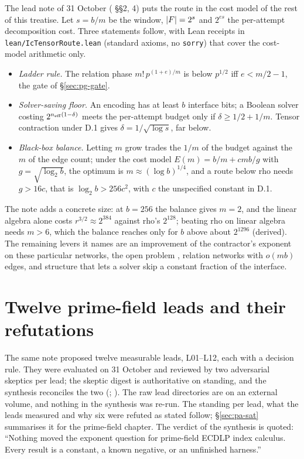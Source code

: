 The lead note of 31 October
( \S\S2, 4) puts the
route in the cost model of the rest of this treatise. Let $s=b/m$ be the
window, $\lvert F \rvert=2^s$ and $2^{es}$ the per-attempt decomposition cost. Three
statements follow, with Lean receipts in \texttt{lean/IcTensorRoute.lean}
(standard axioms, no \texttt{sorry}) that cover the cost-model arithmetic
only.
\begin{itemize}
\item \emph{Ladder rule.} The relation phase $m!\,p^{(1+e)/m}$ is below
  $p^{1/2}$ iff $e<m/2-1$, the gate of \S\ref{sec:pg-gate}.
\item \emph{Solver-saving floor.} An encoding has at least $b$ interface
  bits; a Boolean solver costing $2^{n_{\rm eff}(1-\delta)}$ meets the
  per-attempt budget only if $\delta\ge1/2+1/m$. Tensor contraction under
  D.1 gives $\delta=1/\sqrt{\log s}$, far below.
\item \emph{Black-box balance.} Letting $m$ grow trades the $1/m$ of the
  budget against the $m$ of the edge count; under the cost model
  $E(m)=b/m+cmb/g$ with $g=\sqrt{\log_2b}$, the optimum is
  $m\approx(\log b)^{1/4}$, and a route below rho needs $g>16c$, that is
  $\log_2b>256c^2$, with $c$ the unspecified constant in D.1.
\end{itemize}
The note adds a concrete size: at $b=256$ the balance gives $m=2$, and the
linear algebra alone costs $r^{3/2}\approx2^{384}$ against rho's $2^{128}$;
beating rho on linear algebra needs $m>6$, which the balance reaches only
for $b$ above about $2^{1296}$ (derived). The remaining levers it names are an
improvement of the contractor's exponent on these particular networks, the
open problem , relation
networks with $o(mb)$ edges, and structure that lets a solver skip a
constant fraction of the interface.

\section{Twelve prime-field leads and their refutations}\label{sec:tn-leads}

The same note proposed twelve measurable leads, L01--L12, each with a
decision rule. They were evaluated on 31 October and reviewed by two
adversarial skeptics per lead; the skeptic digest is authoritative on
standing, and the synthesis reconciles the two
(;
). The raw lead
directories are on an external volume, and nothing in the synthesis was
re-run. The standing per lead, what the leads measured and why six were refuted
as stated follow;
\S\ref{sec:pa-sat} summarises it for the prime-field chapter. The verdict of the synthesis is quoted: ``Nothing
moved the exponent question for prime-field ECDLP index calculus. Every
result is a constant, a known negative, or an unfinished harness.''

